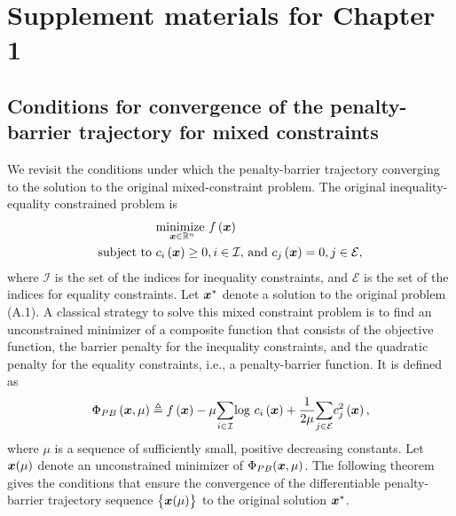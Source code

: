 \chapter{Supplement materials for Chapter 1}
\section{Conditions for convergence of the penalty-barrier trajectory for mixed constraints}
We revisit the conditions under which the  penalty-barrier trajectory converging to the solution to the original mixed-constraint problem. The original inequality-equality constrained problem is 
\begin{align}
\begin{split}
&\underset{\boldsymbol{x} \in \mathbb{R}^n}{\text{minimize }}f\left(\boldsymbol{x}\right)\\
\text{subject to }&  c_i\left(\boldsymbol{x}\right) \ge 0, i\in \mathcal{I} \text{, and } c_j\left(\boldsymbol{x}\right) = 0, j \in \mathcal{E} ,
\end{split}
\end{align}
where $\mathcal{I}$ is the set of the indices for inequality constraints, and $\mathcal{E}$ is the set of the indices for equality constraints. Let $\boldsymbol{x}^*$ denote a solution to the original problem (A.1). A classical strategy to solve this mixed constraint problem is to find an unconstrained minimizer of a composite function that consists of the objective function, the barrier penalty for the inequality constraints, and the quadratic penalty for the equality constraints, i.e., a penalty-barrier function. It is defined as
\begin{align}
\Phi_{PB}\left(\boldsymbol{x}, \mu \right) \triangleq f\left(\boldsymbol{x}\right) - \mu \underset{ i \in \mathcal{I}}{\sum} \text{log }c_i\left(\boldsymbol{x}\right) + \frac{1}{2\mu} \underset{j \in \mathcal{E}}{\sum}c^2_j\left(\boldsymbol{x}\right),
\end{align}
where $\mu$ is a sequence of sufficiently small, positive decreasing constants. Let $\boldsymbol{x}(\mu)$ denote an unconstrained minimizer of $\Phi_{PB}(\boldsymbol{x}, \mu)$. The following theorem gives the conditions that ensure the convergence of the differentiable penalty-barrier trajectory sequence $\left\{ \boldsymbol{x}(\mu)\right\}$ to the original solution $\boldsymbol{x}^*$.

